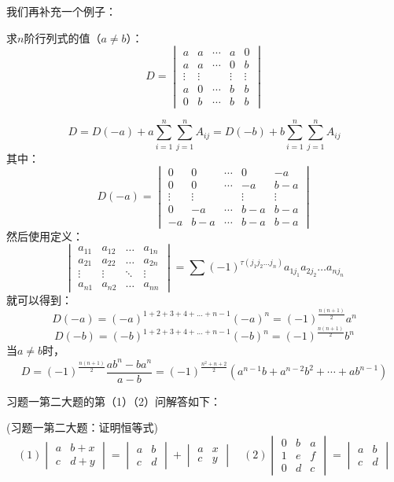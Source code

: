 我们再补充一个例子：
\begin{example}{}{}
    求$n$阶行列式的值（$a\neq b$）：\[D=\begin{vmatrix}
        a&a&\cdots&a&0\\
        a&a&\cdots&0&b\\
        \vdots&\vdots&&\vdots&\vdots\\
        a&0&\cdots&b&b\\
        0&b&\cdots&b&b\end{vmatrix}\]
\end{example}
\begin{solution}{}{}
    \[D=D(-a)+a\sum_{i=1}^n\sum_{j=1}^nA_{ij}=D(-b)+b\sum_{i=1}^n\sum_{j=1}^nA_{ij}\]
    其中：\[D(-a)=\begin{vmatrix}        
        0&0&\cdots&0&-a\\
        0&0&\cdots&-a&b-a\\
        \vdots&\vdots&&\vdots&\vdots\\
        0&-a&\cdots&b-a&b-a\\
        -a&b-a&\cdots&b-a&b-a\end{vmatrix}
    \]
    然后使用定义：
    \[\begin{vmatrix}a_{11}&a_{12}&\ldots&a_{1n}
        \\a_{21}&a_{22}&\ldots&a_{2n}\\
        \vdots&\vdots&\ddots&\vdots\\
        a_{n1}&a_{n2}&\ldots&a_{nn}\end{vmatrix}
        =\sum(-1)^{\tau(j_1j_2\ldots j_n)}a_{1j_1}a_{2j_2}\ldots a_{nj_n}\]
    就可以得到：\[D(-a)=(-a)^{1+2+3+4+...+n-1}(-a)^n=(-1)^{\frac{n(n+1)}{2}}a^n\]
    \[D(-b)=(-b)^{1+2+3+4+...+n-1}(-b)^n=(-1)^{\frac{n(n+1)}{2}}b^n\]
    当$a\neq b$时，\[D=(-1)^{\frac{n(n+1)}{2}}\frac{ab^n-ba^n}{a-b}=(-1)^{\frac{n^2+n+2}{2}}(a^{n-1}b+a^{n-2}b^2+\cdots+ab^{n-1})\]
\end{solution}
习题一第二大题的第（1）（2）问解答如下：
\begin{example}{(习题一第二大题：证明恒等式)}{}
    \[
    (1)\begin{vmatrix}
        a&b+x\\
        c&d+y
    \end{vmatrix}=\begin{vmatrix}
        a&b\\
        c&d
    \end{vmatrix}+\begin{vmatrix}
        a&x\\
        c&y
    \end{vmatrix}\quad
    (2)\begin{vmatrix}
        0&b&a\\
        1&e&f\\
        0&d&c\end{vmatrix}=\begin{vmatrix}
        a&b\\
        c&d\end{vmatrix}\]
\end{example}
